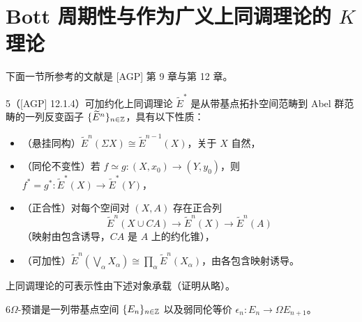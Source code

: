 \section{Bott 周期性与作为广义上同调理论的 $K$ 理论}

下面一节所参考的文献是 [AGP] 第 9 章与第 12 章。

\begin{defn}{5}（[AGP] 12.1.4）可加约化上同调理论 $\widetilde{E}^*$ 是从带基点拓扑空间范畴到 Abel 群范畴的一列反变函子 $\{\widetilde{E}^n\}_{n\in\mathbb{Z}}$，具有以下性质：
\begin{itemize}[leftmargin=1.6em,itemsep=2pt]
\item （悬挂同构）$\widetilde{E}^n(\Sigma X)\cong \widetilde{E}^{n-1}(X)$，关于 $X$ 自然，
\item （同伦不变性）若 $f\simeq g: (X,x_0)\to (Y,y_0)$，则 $f^* = g^*: \widetilde{E}^*(X)\to \widetilde{E}^*(Y)$，
\item （正合性）对每个空间对 $(X,A)$ 存在正合列
\[ \widetilde{E}^n(X\cup CA)\to \widetilde{E}^n(X)\to \widetilde{E}^n(A) \]
（映射由包含诱导，$CA$ 是 $A$ 上的约化锥），
\item （可加性）$\widetilde{E}^n(\bigvee_\alpha X_\alpha)\cong \prod_\alpha \widetilde{E}^n(X_\alpha)$，由各包含映射诱导。
\end{itemize}
\end{defn}


上同调理论的可表示性由下述对象承载（证明从略）。

\begin{defn}{6}$\Omega$-预谱是一列带基点空间 $\{E_n\}_{n\in\mathbb{Z}}$ 以及弱同伦等价 $\epsilon_n: E_n\to \Omega E_{n+1}$。\end{defn}


